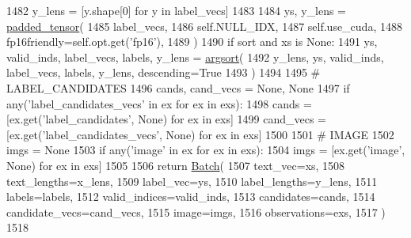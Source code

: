 \begin{DoxyCode}
1482             y\_lens = [y.shape[0] \textcolor{keywordflow}{for} y \textcolor{keywordflow}{in} label\_vecs]
1483 
1484             ys, y\_lens = \hyperlink{namespaceparlai_1_1agents_1_1legacy__agents_1_1seq2seq_1_1utils__v1_adb5a414ae439f14c54e8c760b91cc4c8}{padded\_tensor}(
1485                 label\_vecs,
1486                 self.NULL\_IDX,
1487                 self.use\_cuda,
1488                 fp16friendly=self.opt.get(\textcolor{stringliteral}{'fp16'}),
1489             )
1490             \textcolor{keywordflow}{if} sort \textcolor{keywordflow}{and} xs \textcolor{keywordflow}{is} \textcolor{keywordtype}{None}:
1491                 ys, valid\_inds, label\_vecs, labels, y\_lens = \hyperlink{namespaceparlai_1_1agents_1_1legacy__agents_1_1seq2seq_1_1utils__v1_a1521e559b740f741ebb47b8755202bb2}{argsort}(
1492                     y\_lens, ys, valid\_inds, label\_vecs, labels, y\_lens, descending=\textcolor{keyword}{True}
1493                 )
1494 
1495         \textcolor{comment}{# LABEL\_CANDIDATES}
1496         cands, cand\_vecs = \textcolor{keywordtype}{None}, \textcolor{keywordtype}{None}
1497         \textcolor{keywordflow}{if} any(\textcolor{stringliteral}{'label\_candidates\_vecs'} \textcolor{keywordflow}{in} ex \textcolor{keywordflow}{for} ex \textcolor{keywordflow}{in} exs):
1498             cands = [ex.get(\textcolor{stringliteral}{'label\_candidates'}, \textcolor{keywordtype}{None}) \textcolor{keywordflow}{for} ex \textcolor{keywordflow}{in} exs]
1499             cand\_vecs = [ex.get(\textcolor{stringliteral}{'label\_candidates\_vecs'}, \textcolor{keywordtype}{None}) \textcolor{keywordflow}{for} ex \textcolor{keywordflow}{in} exs]
1500 
1501         \textcolor{comment}{# IMAGE}
1502         imgs = \textcolor{keywordtype}{None}
1503         \textcolor{keywordflow}{if} any(\textcolor{stringliteral}{'image'} \textcolor{keywordflow}{in} ex \textcolor{keywordflow}{for} ex \textcolor{keywordflow}{in} exs):
1504             imgs = [ex.get(\textcolor{stringliteral}{'image'}, \textcolor{keywordtype}{None}) \textcolor{keywordflow}{for} ex \textcolor{keywordflow}{in} exs]
1505 
1506         \textcolor{keywordflow}{return} \hyperlink{namespaceparlai_1_1agents_1_1legacy__agents_1_1seq2seq_1_1torch__agent__v1_a74cfde390a2b9861179ac0fcd59da28c}{Batch}(
1507             text\_vec=xs,
1508             text\_lengths=x\_lens,
1509             label\_vec=ys,
1510             label\_lengths=y\_lens,
1511             labels=labels,
1512             valid\_indices=valid\_inds,
1513             candidates=cands,
1514             candidate\_vecs=cand\_vecs,
1515             image=imgs,
1516             observations=exs,
1517         )
1518 
\end{DoxyCode}
\mbox{\label{classparlai_1_1core_1_1torch__agent_1_1TorchAgent_a233316f9ec2805dd6a08fbf07f3a078a}} 
